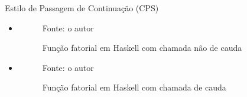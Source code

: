 \begin{frame}{Estilo de Passagem de Continuação (CPS)}
    \begin{itemize}
        \item[] \begin{figure}
                  \caption{Função fatorial em Haskell com chamada não de cauda}
                  
                  \small{Fonte: o autor}
              \end{figure}

        \item[] \begin{figure}
                  \caption{Função fatorial em Haskell com chamada de cauda}
                  
                  \small{Fonte: o autor}
              \end{figure}
    \end{itemize}
\end{frame}
